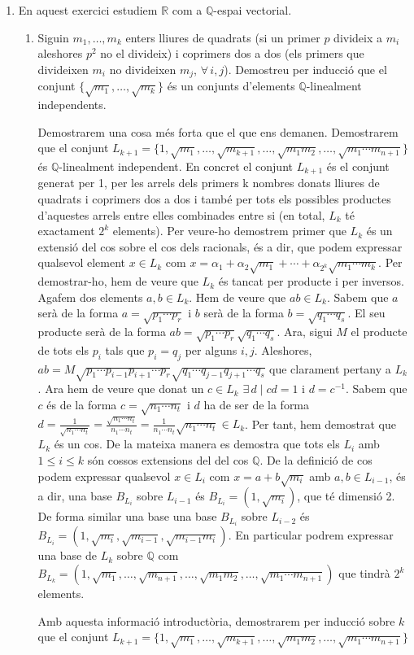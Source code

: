 \documentclass[11pt,a4paper]{article}
\begin{document}
\begin{enumerate}
    
    
    \item En aquest exercici estudiem $\mathbb{R}$ com a $\mathbb{Q}$-espai vectorial.
    \begin{enumerate}
        \item Siguin $m_1,\ldots,m_k$ enters lliures de quadrats (si un primer $p$ divideix a $m_i$ aleshores $p^2$ no el divideix) i coprimers dos a dos (els primers que divideixen $m_i$ no divideixen $m_j$, $\forall\, i,j$). Demostreu per inducció que el conjunt $\{\sqrt{m_1},\ldots,\sqrt{m_k}\}$ és un conjunts d’elements $\mathbb{Q}$-linealment independents.\par
        Demostrarem una cosa més forta que el que ens demanen. Demostrarem que el conjunt $L_{k+1}=\{1,\sqrt{m_1},\ldots,\sqrt{m_{k+1}},\ldots,\sqrt{m_1m_2},\ldots,\sqrt{m_1\cdots m_{n+1}}\}$ és $\mathbb{Q}$-linealment independent. En concret el conjunt $L_{k+1}$ és el conjunt generat per 1, per les arrels dels primers k nombres donats lliures de quadrats i coprimers dos a dos i també per tots els possibles productes d'aquestes arrels entre elles combinades entre si (en total, $L_k$ té exactament $2^k$ elements). Per veure-ho demostrem primer que $L_k$ és un extensió del cos sobre el cos dels racionals, és a dir, que podem expressar qualsevol element $x\in L_k$ com $x=\alpha_1+\alpha_2\sqrt{m_1}+\cdots +\alpha_{2^k}\sqrt{m_1\cdots m_{k}}$. Per demostrar-ho, hem de veure que $L_k$ és tancat per producte i per inversos. Agafem dos elements $a,b\in L_k$. Hem de veure que $ab\in L_k$. Sabem que $a$ serà de la forma $a=\sqrt{p_1\cdots p_r}$ i $b$ serà de la forma $b=\sqrt{q_1\cdots q_s}$. El seu producte serà de la forma $ab=\sqrt{p_1\cdots p_r}\sqrt{q_1\cdots q_s}$. Ara, sigui $M$ el producte de tots els $p_i$ tals que $p_i=q_j$ per alguns $i,j$. Aleshores, $ab=M\sqrt{p_1\cdots p_{i-1}p_{i+1}\cdots p_r}\sqrt{q_1\cdots q_{j-1}q_{j+1}\cdots q_s}$ que clarament pertany a $L_k$. Ara hem de veure que donat un $c\in L_k$ $\exists \,d \mid cd=1$ i $d=c^{-1}$. Sabem que $c$ és de la forma $c=\sqrt{n_1\cdots n_t}$ i $d$ ha de ser de la forma $d=\frac{1}{\sqrt{n_1\cdots n_t}}=\frac{\sqrt{n_1\cdots n_t}}{n_1\cdots n_t}=\frac{1}{n_1\cdots n_t}\sqrt{n_1\cdots n_t}\in L_k$. Per tant, hem demostrat que $L_k$ és un cos. De la mateixa manera es demostra que tots els $L_i$ amb $1\leq i\leq k$ són cossos extensions del del cos $\mathbb{Q}$. De la definició de cos podem expressar qualsevol $x\in L_i$ com $x=a+b\sqrt{m_i}$ amb $a,b \in L_{i-1}$, és a dir, una base $B_{L_i}$ sobre $L_{i-1}$ és $B_{L_i}=(1,\sqrt{m_i})$, que té dimensió 2. De forma similar una base una base $B_{L_i}$ sobre $L_{i-2}$ és $B_{L_i}=(1,\sqrt{m_i},\sqrt{m_{i-1}},\sqrt{m_{i-1}m_i})$. En particular podrem expressar una base de $L_k$ sobre $\mathbb{Q}$ com $B_{L_k}=(1,\sqrt{m_1},\ldots,\sqrt{m_{n+1}},\ldots,\sqrt{m_1m_2},\ldots,\sqrt{m_1\cdots m_{n+1}})$ que tindrà $2^k$ elements. \par Amb aquesta informació introductòria, demostrarem per inducció sobre $k$ que el conjunt $L_{k+1}=\{1,\sqrt{m_1},\ldots,\sqrt{m_{k+1}},\ldots,\sqrt{m_1m_2},\ldots,\sqrt{m_1\cdots m_{n+1}}\}$ 
\end{enumerate}
\end{enumerate}
\end{document}
